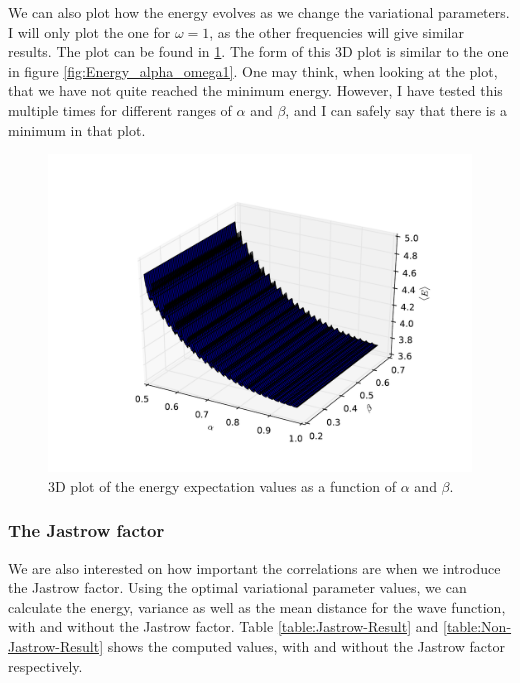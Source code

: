 \documentclass[12pt]{article}
\begin{document}
We can also plot how the energy evolves as we change the variational parameters. I will only plot the one for $\omega = 1$, as the other frequencies will give similar results. The plot can be found in \ref{fig:3DPlot_AlphaBeta_Optimal}. The form of this 3D plot is similar to the one in figure \ref{fig:Energy_alpha_omega1}. One may think, when looking at the plot, that we have not quite reached the minimum energy. However, I have tested this multiple times for different ranges of $\alpha$ and $\beta$, and I can safely say that there is a minimum in that plot.
\begin{figure}[h]
\centering
\includegraphics[width=\linewidth]{Plots/OptimalAlphaBeta_3DPlot.pdf}
\caption{3D plot of the energy expectation values as a function of $\alpha$ and $\beta$.}
\label{fig:3DPlot_AlphaBeta_Optimal}
\end{figure}

\FloatBarrier
\subsubsection{The Jastrow factor}
We are also interested on how important the correlations are when we introduce the Jastrow factor. Using the optimal variational parameter values, we can calculate the energy, variance as well as the mean distance for the wave function, with and without the Jastrow factor. Table \ref{table:Jastrow-Result} and \ref{table:Non-Jastrow-Result} shows the computed values, with and without the Jastrow factor respectively.
\end{document}

